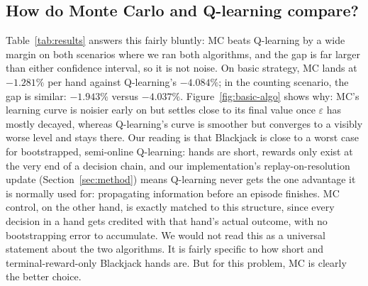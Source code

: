 \documentclass[conference,a4paper]{IEEEtran}
\begin{document}
\subsection{How do Monte Carlo and Q-learning compare?}
\label{sec:algo-compare}
Table~\ref{tab:results} answers this fairly bluntly: MC beats Q-learning by
a wide margin on both scenarios where we ran both algorithms, and the gap is
far larger than either confidence interval, so it is not noise. On basic
strategy, MC lands at $-1.281\%$ per hand against Q-learning's $-4.084\%$;
in the counting scenario, the gap is similar: $-1.943\%$ versus $-4.037\%$.
Figure~\ref{fig:basic-algo} shows why: MC's learning curve is noisier
early on but settles close to its final value once $\varepsilon$ has mostly
decayed, whereas Q-learning's curve is smoother but converges to a visibly
worse level and stays there. Our reading is that Blackjack is close to a
worst case for bootstrapped, semi-online Q-learning: hands are short,
rewards only exist at the very end of a decision chain, and our
implementation's replay-on-resolution update (Section~\ref{sec:method})
means Q-learning never gets the one advantage it is normally used for:
propagating information before an episode finishes. MC control, on the
other hand, is exactly matched to this structure, since every decision in a
hand gets credited with that hand's actual outcome, with no bootstrapping
error to accumulate. We would not read this as a universal statement about
the two algorithms. It is fairly specific to how short and
terminal-reward-only Blackjack hands are. But for this problem, MC is
clearly the better choice.
\end{document}
